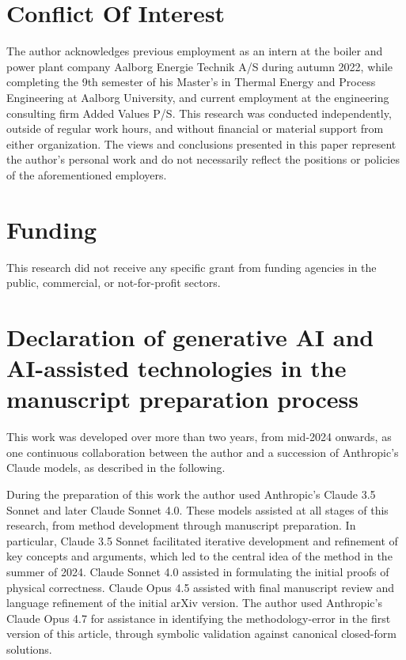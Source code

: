 \documentclass[preprint,1p,times]{elsarticle}
\theoremstyle{plain}
\theoremstyle{definition}
\theoremstyle{remark}
\begin{document}
\section*{Conflict Of Interest}

The author acknowledges previous employment as an intern at the boiler and power plant company Aalborg Energie Technik A/S during autumn 2022, while completing the 9th semester of his Master's in Thermal Energy and Process Engineering at Aalborg University, and current employment at the engineering consulting firm Added Values P/S. This research was conducted independently, outside of regular work hours, and without financial or material support from either organization. The views and conclusions presented in this paper represent the author's personal work and do not necessarily reflect the positions or policies of the aforementioned employers.

\section*{Funding}

This research did not receive any specific grant from funding agencies in the public, commercial, or not-for-profit sectors.

\section*{Declaration of generative AI and AI-assisted technologies in the manuscript preparation process}

This work was developed over more than two years, from mid-2024 onwards, as one continuous collaboration between the author and a succession of Anthropic's Claude models, as described in the following.

During the preparation of this work the author used Anthropic's Claude 3.5 Sonnet and later Claude Sonnet 4.0. These models assisted at all stages of this research, from method development through manuscript preparation. In particular, Claude 3.5 Sonnet facilitated iterative development and refinement of key concepts and arguments, which led to the central idea of the method in the summer of 2024. Claude Sonnet 4.0 assisted in formulating the initial proofs of physical correctness. Claude Opus 4.5 assisted with final manuscript review and language refinement of the initial arXiv version. The author used Anthropic's Claude Opus 4.7 for assistance in identifying the methodology-error in the first version of this article, through symbolic validation against canonical closed-form solutions.
\end{document}
